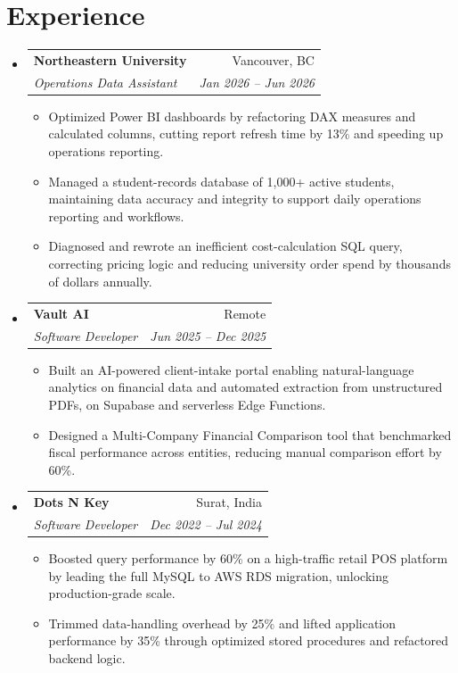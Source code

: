 \documentclass[letterpaper,11pt]{article}
\makeatletter
\newcommand{\resumeItem}[1]{
  \item\small{
    {#1 \vspace{-2pt}}
  }
}
\newcommand{\resumeSubheading}[4]{
  \vspace{-2pt}\item
    \begin{tabular*}{0.97\textwidth}[t]{l@{\extracolsep{\fill}}r}
      \textbf{#1} & #2 \\
      \textit{\small#3} & \textit{\small #4} \\
    \end{tabular*}\vspace{-7pt}
}
\newcommand{\resumeSubHeadingListStart}{\begin{itemize}[leftmargin=0.15in, label={}]}
\newcommand{\resumeSubHeadingListEnd}{\end{itemize}}
\newcommand{\resumeItemListStart}{\begin{itemize}}
\newcommand{\resumeItemListEnd}{\end{itemize}\vspace{-5pt}}
\makeatother
\begin{document}
\section{Experience}
  \resumeSubHeadingListStart
    \resumeSubheading
      {Northeastern University}{Vancouver, BC}
      {Operations Data Assistant}{Jan 2026 -- Jun 2026}
      \resumeItemListStart
        \resumeItem{Optimized Power BI dashboards by refactoring DAX measures and calculated columns, cutting report refresh time by 13\% and speeding up operations reporting.}
        \resumeItem{Managed a student-records database of 1,000+ active students, maintaining data accuracy and integrity to support daily operations reporting and workflows.}
        \resumeItem{Diagnosed and rewrote an inefficient cost-calculation SQL query, correcting pricing logic and reducing university order spend by thousands of dollars annually.}
      \resumeItemListEnd
    \resumeSubheading
      {Vault AI}{Remote}
      {Software Developer}{Jun 2025 -- Dec 2025}
      \resumeItemListStart
        \resumeItem{Built an AI-powered client-intake portal enabling natural-language analytics on financial data and automated extraction from unstructured PDFs, on Supabase and serverless Edge Functions.}
        \resumeItem{Designed a Multi-Company Financial Comparison tool that benchmarked fiscal performance across entities, reducing manual comparison effort by 60\%.}
      \resumeItemListEnd
    \resumeSubheading
      {Dots N Key}{Surat, India}
      {Software Developer}{Dec 2022 -- Jul 2024}
      \resumeItemListStart
        \resumeItem{Boosted query performance by 60\% on a high-traffic retail POS platform by leading the full MySQL to AWS RDS migration, unlocking production-grade scale.}
        \resumeItem{Trimmed data-handling overhead by 25\% and lifted application performance by 35\% through optimized stored procedures and refactored backend logic.}
      \resumeItemListEnd
  \resumeSubHeadingListEnd

\end{document}
